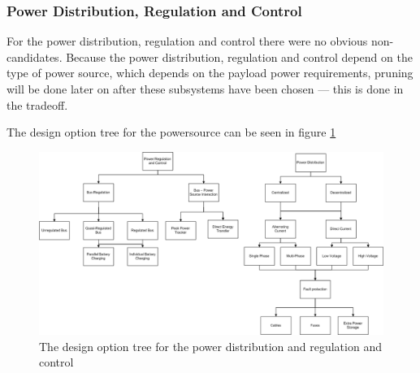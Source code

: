 \subsubsection{Power Distribution, Regulation and Control}
\label{pruneEPS:Distribution}
For the power distribution, regulation and control there were no obvious non-candidates. Because the power distribution, regulation and control depend on the type of power source, which depends on the payload power requirements, pruning will be done later on after these subsystems have been chosen --- this is done in the tradeoff.

The design option tree for the powersource can be seen in figure \ref{fig:DOTeps_reganddisPruned}

\begin{figure}
\centering
\includegraphics[width=\textheight, angle=90]{chapters/img/DOTeps_reganddisPruned.png}
\caption{The design option tree for the power distribution and regulation and control}
\label{fig:DOTeps_reganddisPruned}
\end{figure}



